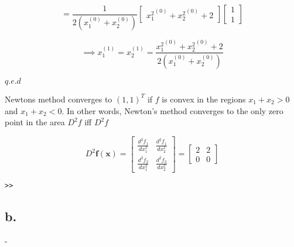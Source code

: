 \documentclass[00-main.tex]{subfiles}
\begin{document}
\begin{equation}
=
\frac{1}{2(x_1^{(0)} + x_2^{(0)})} 
\left[
\begin{array}{cc} 
	{x_1^{2}}^{(0)} + {x_2^2}^{(0)} + 2 
\end{array}
\right]

\left[
\begin{array}{cc} 	
	1 \\
	1
\end{array}
\right]

\end{equation}

\begin{equation}
\implies
x_1^{(1)} = x_2^{(1)}
=
\frac{{x_1^{2}}^{(0)} + {x_2^2}^{(0)} + 2 }{2(x_1^{(0)} + x_2^{(0)})} 
\end{equation}
\label{2a}

$q.e.d$

Newtons method converges to $(1,1)^T$ if $f$ is convex in the regions $x_1+x_2>0$ and $x_1+x_2<0$. In other words, Newton's method converges to the only zero point in the area $D^2f$ iff $D^2 f$ 

\begin{equation}
D^2\mathbf{f}(\mathbf{x})
=
\left[ 	
	\begin{array}{cc} 
		\frac{d^2 f_1}{dx_1^2} & \frac{d^2 f_1}{dx_2^2} \\ 
		\frac{d^2 f_2}{dx_1^2} & \frac{d^2f_2}{dx_2^2}  
	\end{array} 
\right]
=
\left[ 	
	\begin{array}{cc} 
		2 & 2 \\ 
		0    & 0  
	\end{array} 
\right] 
\end{equation}


\begin{verbatim}
>> 
\end{verbatim}

\subsection*{b.}
-
\end{document}
